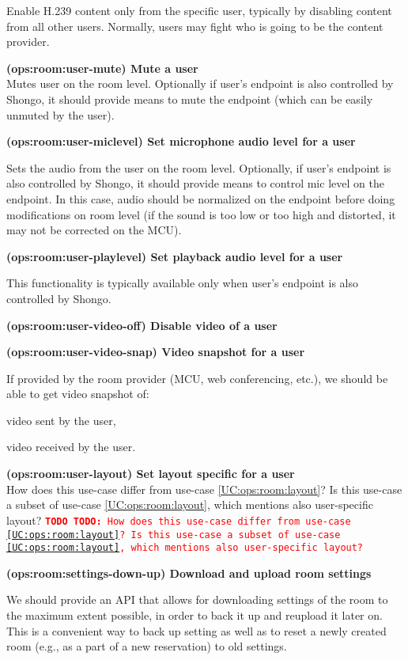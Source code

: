 \documentclass[a4paper]{report}
\makeatletter
\newcounter{UCcounter}
\newenvironment{UseCases}%
	{\begin{list}{\textbf{UC-\arabic{UCcounter}}}{\@nmbrlisttrue\def\@listctr{UCcounter}}}%
	{\end{list}}
\newcommand{\UClabel}[1]{\label{UC:#1}}
\newcommand{\UseCase}[2]{\item\UClabel{#2} \textbf{(#2) #1}\\ \nopagebreak}
\newcommand{\TODO}[1]{%
\def\empty{}%
\def\prvniparametr{#1}%
\ifx\prvniparametr\empty%
\begingroup\tt\textcolor{red}{\noindent\textbf{TODO}}\endgroup
\else%
\begingroup\tt\textcolor{red}{\noindent\textbf{TODO:}\ #1}\endgroup
\fi%
}
\makeatother
\begin{document}
\begin{UseCases}
Enable H.239 content only from the specific user, typically by disabling
content from all other users. Normally, users may fight who is going to be the
content provider.

\UseCase{Mute a user}{ops:room:user-mute} Mutes user on the room level.
Optionally if user's endpoint is also controlled by Shongo, it should provide
means to mute the endpoint (which can be easily unmuted by the user).

\UseCase{Set microphone audio level for a user}{ops:room:user-miclevel}

Sets the audio from the user on the room level. Optionally, if user's endpoint
is also controlled by Shongo, it should provide means to control mic level on
the endpoint. In this case, audio should be normalized on the endpoint before
doing modifications on room level (if the sound is too low or too high and
distorted, it may not be corrected on the MCU).

\UseCase{Set playback audio level for a user}{ops:room:user-playlevel}

This functionality is typically available only when user's endpoint is also
controlled by Shongo.

\UseCase{Disable video of a user}{ops:room:user-video-off}

\UseCase{Video snapshot for a user}{ops:room:user-video-snap}

If provided by the room provider (MCU, web conferencing, etc.), we should be
able to get video snapshot of:

\begin{compactitem}

\item video sent by the user,

\item video received by the user.

\end{compactitem}


\UseCase{Set layout specific for a user}{ops:room:user-layout}
\TODO{How does this use-case differ from use-case \ref{UC:ops:room:layout}? Is this use-case a subset of use-case \ref{UC:ops:room:layout}, which mentions also user-specific layout?}

\UseCase{Download and upload room settings}{ops:room:settings-down-up}

We should provide an API that allows for downloading settings of the room to
the maximum extent possible, in order to back it up and reupload it later on.
This is a convenient way to back up setting as well as to reset a newly created
room (e.g., as a part of a new reservation) to old settings.


\end{UseCases}
\end{document}
